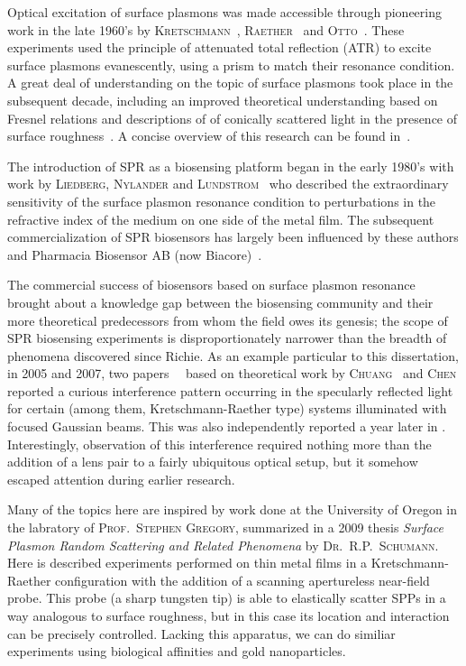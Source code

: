 \documentclass[a4paper,titlepage,onecolumn]{report}
\begin{document}
Optical excitation of surface plasmons was made accessible through
pioneering work in the late 1960's by
\textsc{Kretschmann}~\cite{kretschmann1968},
\textsc{Raether}~\cite{raether1965springer} and
\textsc{Otto}~\cite{otto1968excitation}.  These experiments used the
principle of attenuated total reflection (ATR) to excite surface plasmons
evanescently, using a prism to match their resonance condition.  A great
deal of understanding on the topic of surface plasmons took place in the
subsequent decade, including an improved theoretical understanding based on
Fresnel relations \cite{chen1976excitation} and descriptions of of
conically scattered light in the presence of surface
roughness~\cite{simon1976directional}.  A concise overview of this research
can be found in~\cite{raether1997surface}.

The introduction of SPR as a biosensing platform began in the early 1980's
with work by \textsc{Liedberg}, \textsc{Nylander} and
\textsc{Lundstrom}~\cite{liedberg1983surface} who described the
extraordinary sensitivity of the surface plasmon resonance condition to
perturbations in the refractive index of the medium on one side of the
metal film.  The subsequent commercialization of SPR biosensors has largely
been influenced by these authors and Pharmacia Biosensor AB (now
Biacore)~\cite{liedberg1995biosensing}.

The commercial success of biosensors based on surface plasmon resonance
brought about a knowledge gap between the biosensing community and their
more theoretical predecessors from whom the field owes its genesis; the
scope of SPR biosensing experiments is disproportionately narrower than the
breadth of phenomena discovered since Richie.  As an example particular to
this dissertation, in 2005 and 2007, two
papers~\cite{andaloro2005optical}~\cite{simon2007observation} based on
theoretical work by \textsc{Chuang}~\cite{chuang1986lateral} and
\textsc{Chen} \cite{chen1976excitation} reported a curious interference
pattern occurring in the specularly reflected light for certain (among
them, Kretschmann-Raether type) systems illuminated with focused Gaussian
beams.  This was also independently reported a year later in
\cite{schumann2008near}.  Interestingly, observation of this interference
required nothing more than the addition of a lens pair to a fairly
ubiquitous optical setup, but it somehow escaped attention during earlier
research.  

Many of the topics here are inspired by work done at the University of
Oregon in the labratory of \textsc{Prof\@.~Stephen Gregory}, summarized in
a 2009 thesis \textit{Surface Plasmon Random Scattering and Related
Phenomena} \cite{schumann2009surface} by \textsc{Dr\@.~R\@.P.\@~Schumann}.
Here is described experiments performed on thin metal films in a
Kretschmann-Raether configuration with the addition of a scanning
apertureless near-field probe.  This probe (a sharp tungsten tip) is able
to elastically scatter SPPs in a way analogous to surface roughness, but in
this case its location and interaction can be precisely controlled.
Lacking this apparatus, we can do similiar experiments using biological
affinities and gold nanoparticles.
\end{document}
